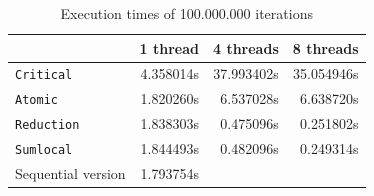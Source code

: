 
\begin{table}[H]
\centering
\begin{tabular}{lrrr}
\toprule
    & 1 thread & 4 threads & 8 threads \\
\midrule
    \texttt{Critical}    & 4.358014s     & 37.993402s    & 35.054946s    \\
    \texttt{Atomic}      & 1.820260s     & 6.537028s     & 6.638720s     \\
    \texttt{Reduction}   & 1.838303s     & 0.475096s     & 0.251802s     \\
    \texttt{Sumlocal}    & 1.844493s     & 0.482096s     & 0.249314s     \\
\midrule
    Sequential version   & 1.793754s     &               &               \\
\bottomrule
\end{tabular}

\caption{Execution times of 100.000.000 iterations} 
\label{tab:Execution_time}
\end{table}



